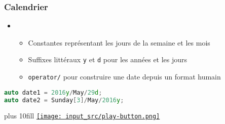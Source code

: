 \documentclass[C++.tex]{subfiles}
\begin{document}
\begin{frame}[fragile]
	\frametitle{Calendrier}
	\begin{itemize}
		\item [] \begin{itemize}
			\item Constantes représentant les jours de la semaine et les mois
			\item Suffixes littéraux \lstinline|y| et \lstinline|d| pour les années et les jours
			\item \lstinline|operator/| pour construire une date depuis un format \og humain\fg{}
		\end{itemize}
	\end{itemize}

	\begin{lstlisting}[language=C++]
auto date1 = 2016y/May/29d;
auto date2 = Sunday[3]/May/2016y;\end{lstlisting}

	\vskip 10mm plus 10fill
	\hfill
	\href{https://godbolt.org/#g:!((g:!((g:!((h:codeEditor,i:(filename:'1',fontScale:14,fontUsePx:'0',j:1,lang:c%2B%2B,selection:(endColumn:1,endLineNumber:15,positionColumn:1,positionLineNumber:15,selectionStartColumn:1,selectionStartLineNumber:1,startColumn:1,startLineNumber:1),source:'%23include+%3Ciostream%3E%0A%23include+%3Cchrono%3E%0A%23include+%3Cformat%3E%0A%0Ausing+namespace+std::literals::chrono_literals%3B%0A%0Aint+main()%0A%7B%0A++auto+date1+%3D+2016y/std::chrono::May/29d%3B%0A++auto+date2+%3D+std::chrono::Sunday%5B3%5D/std::chrono::May/2016y%3B%0A%0A++std::cout+%3C%3C+std::format(%22%7B:%25F%7D%22,+date1)+%3C%3C+%22%5Cn%22%3B%0A++std::cout+%3C%3C+std::format(%22%7B:%25F%7D%22,+date2)+%3C%3C+%22%5Cn%22%3B%0A%7D%0A'),l:'5',n:'0',o:'C%2B%2B+source+%231',t:'0')),k:50,l:'4',n:'0',o:'',s:0,t:'0'),(g:!((h:executor,i:(argsPanelShown:'1',compilationPanelShown:'0',compiler:gsnapshot,compilerName:'',compilerOutShown:'0',execArgs:'',execStdin:'',fontScale:14,fontUsePx:'0',j:1,lang:c%2B%2B,libs:!((name:boost,ver:'175')),options:'-std%3Dc%2B%2B20+-Wall+-Wextra+-pedantic',source:1,stdinPanelShown:'1',tree:'1',wrap:'0'),l:'5',n:'0',o:'Executor+x86-64+gcc+(trunk)+(C%2B%2B,+Editor+%231)',t:'0')),header:(),k:50,l:'4',n:'0',o:'',s:0,t:'0')),l:'2',n:'0',o:'',t:'0')),version:4}{\texttt{[image: input\_src/play-button.png]}}
\end{frame}
\end{document}
